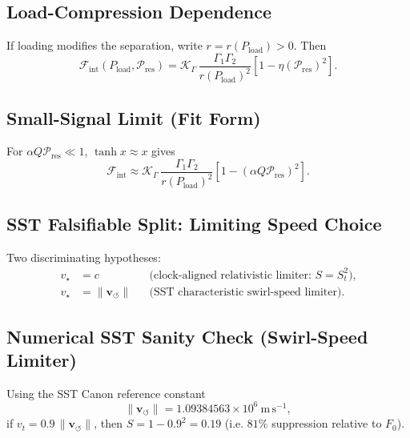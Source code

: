 \documentclass[11pt, a4paper]{article}
\newcommand{\vswirl}{\mathbf{v}_{\!\boldsymbol{\circlearrowleft}}}
\begin{document}
        \subsection{Load-Compression Dependence}
            If loading modifies the separation, write $r=r(P_{\mathrm{load}})>0$. Then
            \begin{equation}
                \mathcal{F}_{\mathrm{int}}(P_{\mathrm{load}},\mathcal{P}_{\mathrm{res}})
                =
                \mathcal{K}_{\Gamma}\,
                \frac{\Gamma_1\Gamma_2}{r(P_{\mathrm{load}})^2}
                \left[1-\eta(\mathcal{P}_{\mathrm{res}})^2\right].
                \label{eq:Fmaster}
            \end{equation}
        
        \subsection{Small-Signal Limit (Fit Form)}
            For $\alpha Q \mathcal{P}_{\mathrm{res}}\ll 1$, $\tanh x \approx x$ gives
            \begin{equation}
                \mathcal{F}_{\mathrm{int}}
                \approx
                \mathcal{K}_{\Gamma}\,
                \frac{\Gamma_1\Gamma_2}{r(P_{\mathrm{load}})^2}
                \left[1-(\alpha Q \mathcal{P}_{\mathrm{res}})^2\right].
                \label{eq:Fmaster_small}
            \end{equation}
        
        \subsection{SST Falsifiable Split: Limiting Speed Choice}
            Two discriminating hypotheses:
            \begin{align}
                v_\star &= c
                &&\text{(clock-aligned relativistic limiter: } S=S_t^2\text{),}
                \\
                v_\star &= \lVert \vswirl \rVert
                &&\text{(SST characteristic swirl-speed limiter).}
            \end{align}
        
        \subsection{Numerical SST Sanity Check (Swirl-Speed Limiter)}
            Using the SST Canon reference constant
            \begin{equation}
                \lVert \vswirl \rVert
                =1.09384563\times 10^6\ \mathrm{m\,s^{-1}},
            \end{equation}
            if $v_t = 0.9\,\lVert \vswirl \rVert$, then
            $S = 1 - 0.9^2 = 0.19$ (i.e. $81\%$ suppression relative to $F_0$).
\end{document}
